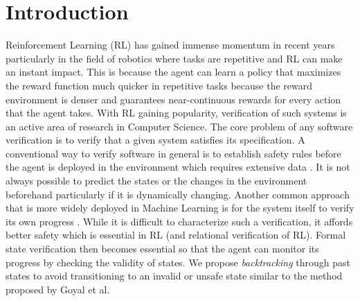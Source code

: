 \documentclass[acmsmall,review,authorversion]{acmart}
\begin{document}
\section{Introduction}
Reinforcement Learning (RL) has gained immense momentum in recent years particularly in the field of robotics where tasks are repetitive and RL can make an instant impact. This is because the agent can learn a policy that maximizes the reward function much quicker in repetitive tasks because the reward environment is denser and guarantees near-continuous rewards for every action that the agent takes. With RL gaining popularity, verification of such systems is an active area of research in Computer Science. The core problem of any software verification is to verify that a given system satisfies its specification. A conventional way to verify software in general is to establish safety rules before the agent is deployed in the environment which requires extensive data \cite{gopinath:2017}. It is not always possible to predict the states or the changes in the environment beforehand particularly if it is dynamically changing. Another common approach that is more widely deployed in Machine Learning is for the system itself to verify its own progress \cite{zhu:2019,sun:2019}. While it is difficult to characterize such a verification, it affords better safety which is essential in RL (and relational verification of RL). Formal state verification then becomes essential so that the agent can monitor its progress by checking the validity of states. We propose \emph{backtracking} through past states to avoid transitioning to an invalid or unsafe state similar to the method proposed by Goyal et al. \cite{DBLP:journals/corr/abs-1804-00379}
\end{document}

